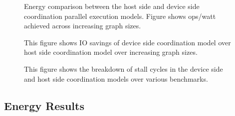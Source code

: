 \begin{figure}[t]
	\centering
	\caption{Energy comparison between the host side and device side coordination parallel execution models. Figure shows ops/watt achieved across increasing graph sizes.}
	\label{fig:energy_comp}
\end{figure}

\begin{figure}[t]
	\centering
	\caption{This figure shows IO savings of device side coordination model over host side coordination model over increasing graph sizes.}
	\label{fig:ioreduction}
\end{figure}

\begin{figure}[t]
	\centering
	\caption{This figure shows the breakdown of stall cycles in the device side and host side coordination models over various benchmarks.}
	\label{fig:stalls}
\end{figure}



\subsection{Energy Results}
